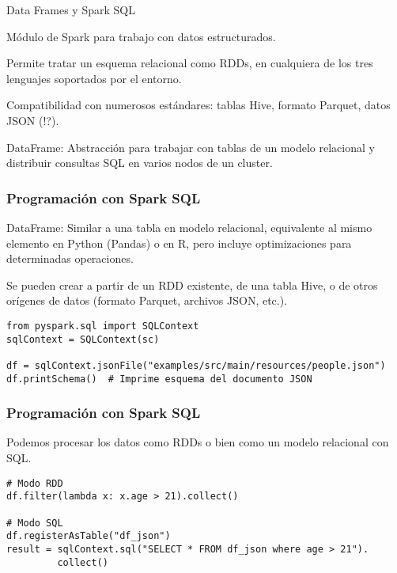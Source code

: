 \begin{frame}{Data Frames y Spark SQL}
\begin{wideitemize}
 \item Módulo de Spark para trabajo con datos estructurados.
 
 \item Permite tratar un esquema relacional como RDDs, en cualquiera de los tres
 lenguajes soportados por el entorno.
 
 \item Compatibilidad con numerosos estándares: tablas Hive, formato Parquet,
 datos JSON (!?).
 
 \item DataFrame: Abstracción para trabajar con tablas de un modelo relacional y
 distribuir consultas SQL en varios nodos de un cluster.
\end{wideitemize}


\end{frame}


\begin{frame}[fragile]
  \frametitle{Programación con Spark SQL}
\begin{wideitemize}
 \item DataFrame: Similar a una tabla en modelo relacional, equivalente al mismo
 elemento en Python (Pandas) o en R, pero incluye optimizaciones para determinadas
 operaciones.
 
 \item Se pueden crear a partir de un RDD existente, de una tabla Hive, o de
 otros orígenes de datos (formato Parquet, archivos JSON, etc.).
\end{wideitemize}

 \fontsize{8pt}{12pt}\selectfont
  \begin{verbatim}
from pyspark.sql import SQLContext
sqlContext = SQLContext(sc)

df = sqlContext.jsonFile("examples/src/main/resources/people.json")
df.printSchema()  # Imprime esquema del documento JSON
  \end{verbatim}

\end{frame}


\begin{frame}[fragile]
  \frametitle{Programación con Spark SQL}
\begin{wideitemize}
 \item Podemos procesar los datos como RDDs o bien como un modelo relacional con SQL.
\end{wideitemize}

 \fontsize{8pt}{12pt}\selectfont
  \begin{verbatim}
# Modo RDD
df.filter(lambda x: x.age > 21).collect()

# Modo SQL
df.registerAsTable("df_json")
result = sqlContext.sql("SELECT * FROM df_json where age > 21").
         collect()
  \end{verbatim}

\end{frame}

